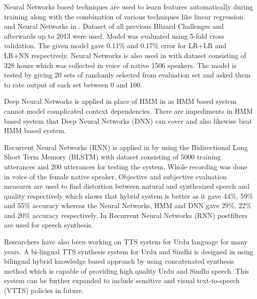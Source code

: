 Neural Networks based techniques are used to learn features automatically during training along with the combination of various techniques like linear regression and Neural Networks in \cite{yoshimura2016hierarchical}. Dataset of all previous Blizard Challenges \cite{blizzard_2009_corpus} and afterwards up to 2013 were used. Model was evaluated using 5-fold cross validation. The given model gave 0.11\% and 0.17\% error for LR+LR and LR+NN respectively. Neural Networks is also used in \cite{wu2016merlin} with dataset consisting of 328 hours which was collected in voice of native 1506 speakers. The model is tested by giving 20 sets of randomly selected from evaluation set and asked them to rate output of each set between 0 and 100.

Deep Neural Networks is applied in place of HMM in \cite{ze2013statistical} as HMM based system cannot model complicated context dependencies. There are impediments in HMM based system that Deep Neural Networks (DNN) can cover and also likewise beat HMM based system. 

Recurrent Neural Networks (RNN) is applied in \cite{fan2014tts} by using the Bidirectional Long Short Term Memory (BLSTM) with dataset consisting of 5000 training utterances and 200 utterances for testing the system. Whole recording was done in voice of the female native speaker. Objective and subjective evaluation measures are used to find distortion between natural and synthesized speech and quality respectively which shows that hybrid system is better as it gave 44\%, 59\% and 55\% accuracy whereas the Neural Networks, HMM and DNN gave 29\%, 22\% and 20\% accuracy respectively. In \cite{muthukumar2016recurrent} Recurrent Neural Networks (RNN) postfilters are used for speech synthesis. 

Researchers have also been working on TTS system for Urdu language for many years. A bi-lingual TTS synthesis 
system for Urdu and Sindhi is designed in \cite{shah2004bi} using bilingual hybrid knowledge based approach by using concatenated synthesis method which is capable of providing high quality Urdu and Sindhi speech. This system can be further expanded to include sensitive and visual text-to-speech (VTTS) policies in future.


